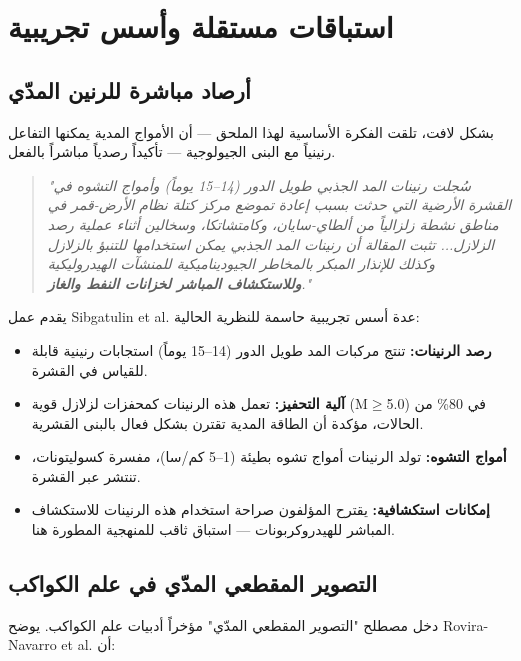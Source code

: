 \documentclass[12pt,a4paper]{article}
\theoremstyle{remark}
\begin{document}
	\section{استباقات مستقلة وأسس تجريبية}
	\label{sec:prior}
	
	\subsection{أرصاد مباشرة للرنين المدّي}
	
	بشكل لافت، تلقت الفكرة الأساسية لهذا الملحق — أن الأمواج المدية يمكنها التفاعل رنينياً مع البنى الجيولوجية — تأكيداً رصدياً مباشراً بالفعل.
	
	\begin{quotation}
		\noindent
		\textit{"سُجلت رنينات المد الجذبي طويل الدور (14–15 يوماً) وأمواج التشوه في القشرة الأرضية التي حدثت بسبب إعادة تموضع مركز كتلة نظام الأرض-قمر في مناطق نشطة زلزالياً من ألطاي-سايان، وكامتشاتكا، وسخالين أثناء عملية رصد الزلازل... تثبت المقالة أن رنينات المد الجذبي يمكن استخدامها للتنبؤ بالزلازل وكذلك للإنذار المبكر بالمخاطر الجيوديناميكية للمنشآت الهيدروليكية \textbf{وللاستكشاف المباشر لخزانات النفط والغاز}."} \cite{Sibgatulin2014}
	\end{quotation}
	
	يقدم عمل Sibgatulin et al. \cite{Sibgatulin2014} عدة أسس تجريبية حاسمة للنظرية الحالية:
	
	\begin{itemize}
		\item \textbf{رصد الرنينات:} تنتج مركبات المد طويل الدور (14–15 يوماً) استجابات رنينية قابلة للقياس في القشرة.
		\item \textbf{آلية التحفيز:} تعمل هذه الرنينات كمحفزات لزلازل قوية (M\(\ge\)5.0) في 80\% من الحالات، مؤكدة أن الطاقة المدية تقترن بشكل فعال بالبنى القشرية.
		\item \textbf{أمواج التشوه:} تولد الرنينات أمواج تشوه بطيئة (1–5 كم/سا)، مفسرة كسوليتونات، تنتشر عبر القشرة.
		\item \textbf{إمكانات استكشافية:} يقترح المؤلفون صراحة استخدام هذه الرنينات للاستكشاف المباشر للهيدروكربونات — استباق ثاقب للمنهجية المطورة هنا.
	\end{itemize}
	
	\subsection{التصوير المقطعي المدّي في علم الكواكب}
	
	دخل مصطلح "التصوير المقطعي المدّي" مؤخراً أدبيات علم الكواكب. يوضح Rovira-Navarro et al. \cite{RoviraNavarro2025} أن:
	
\end{document}
